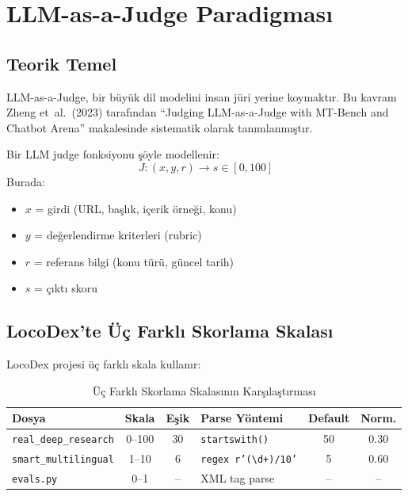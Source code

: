 \section{LLM-as-a-Judge Paradigmas{\i}}
\label{sec:trust-llm-judge}

\subsection{Teorik Temel}

LLM-as-a-Judge, bir b\"{u}y\"{u}k dil modelini insan j\"{u}ri yerine koymakt{\i}r. Bu kavram Zheng et~al.\ (2023) taraf{\i}ndan ``Judging LLM-as-a-Judge with MT-Bench and Chatbot Arena'' makalesinde sistematik olarak tan{\i}mlanm{\i}\c{s}t{\i}r.

\begin{formulbox}
Bir LLM judge fonksiyonu \c{s}\"{o}yle modellenir:
\begin{equation}
\label{eq:llm-judge}
J: (x, y, r) \longrightarrow s \in [0, 100]
\end{equation}
Burada:
\begin{itemize}[leftmargin=1.5em]
  \item $x$ = girdi (URL, ba\c{s}l{\i}k, i\c{c}erik \"{o}rne\u{g}i, konu)
  \item $y$ = de\u{g}erlendirme kriterleri (rubric)
  \item $r$ = referans bilgi (konu t\"{u}r\"{u}, g\"{u}ncel tarih)
  \item $s$ = \c{c}{\i}kt{\i} skoru
\end{itemize}
\end{formulbox}

\subsection{LocoDex'te \"{U}\c{c} Farkl{\i} Skorlama Skalas{\i}}

LocoDex projesi \"{u}\c{c} farkl{\i} skala kullan{\i}r:

\begin{table}[H]
\centering
\caption{\"{U}\c{c} Farkl{\i} Skorlama Skalas{\i}n{\i}n Kar\c{s}{\i}la\c{s}t{\i}rmas{\i}}
\label{tab:scoring-scales}
\begin{tabularx}{\textwidth}{lccXcc}
\toprule
\color{chapterBlue}\textbf{Dosya} & \color{chapterBlue}\textbf{Skala} & \color{chapterBlue}\textbf{E\c{s}ik} & \color{chapterBlue}\textbf{Parse Y\"{o}ntemi} & \color{chapterBlue}\textbf{Default} & \color{chapterBlue}\textbf{Norm.} \\
\midrule
\texttt{real\_deep\_research} & 0--100 & 30 & \texttt{startswith()} & 50 & 0.30 \\
\texttt{smart\_multilingual}  & 1--10  & 6  & \texttt{regex r'(\textbackslash d+)/10'} & 5  & 0.60 \\
\texttt{evals.py}            & 0--1   & -- & XML tag parse    & -- & -- \\
\bottomrule
\end{tabularx}
\end{table}

